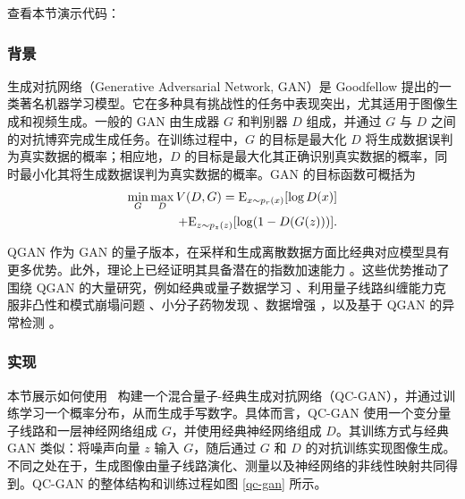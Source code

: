 查看本节演示代码：\href{https://gitee.com/mindspore/mindquantum/blob/research/paper_with_code/variational_quantum_circuits_enhanced_generative_adversarial_network/QGAN.py}{\color{ceruleanblue}{Gitee}} \ \href{https://github.com/donghufeng/mindquantum_tutorial_code/blob/master/whitepaper/code/chapt05/5.7_Q-GAN/QGAN.py}{\color{ceruleanblue}{GitHub}}

\subsubsection{背景}
生成对抗网络（Generative Adversarial Network, GAN）是 Goodfellow 提出的一类著名机器学习模型。它在多种具有挑战性的任务中表现突出，尤其适用于图像生成和视频生成。一般的 GAN 由生成器 ${G}$ 和判别器 ${D}$ 组成，并通过 ${G}$ 与 ${D}$ 之间的对抗博弈完成生成任务。在训练过程中，${G}$ 的目标是最大化 ${D}$ 将生成数据误判为真实数据的概率；相应地，${D}$ 的目标是最大化其正确识别真实数据的概率，同时最小化其将生成数据误判为真实数据的概率。GAN 的目标函数可概括为
\begin{equation}
  \begin{split}
    \mathop {\min }\limits_G \mathop {\max }\limits_D V(D,G) = {\rm{ }}{{\rm{E}}_{x\sim{p_r}(x)}}[\log D(x)]
    \\+ {{\rm{E}}_{z\sim{p_z}(z)}}[\log (1 - D(G(z)))]. \label{eq1}
  \end{split}
\end{equation}

QGAN 作为 GAN 的量子版本，在采样和生成离散数据方面比经典对应模型具有更多优势。此外，理论上已经证明其具备潜在的指数加速能力 \cite{lloyd2018quantum}。这些优势推动了围绕 QGAN 的大量研究，例如经典或量子数据学习 \cite{benedetti2019adversarial, zeng2019learning, zoufal2019quantum,ahmed2021quantum}、利用量子线路纠缠能力克服非凸性和模式崩塌问题 \cite{niu2022entangling}、小分子药物发现 \cite{li2021quantum}、数据增强 \cite{nakaji2021quantum}，以及基于 QGAN 的异常检测 \cite{herr2021anomaly}。

\subsubsection{实现}
本节展示如何使用 \MindQuantum\ 构建一个混合量子-经典生成对抗网络（QC-GAN）\cite{shu2024variational}，并通过训练学习一个概率分布，从而生成手写数字。具体而言，QC-GAN 使用一个变分量子线路和一层神经网络组成 ${G}$，并使用经典神经网络组成 ${D}$。其训练方式与经典 GAN 类似：将噪声向量 ${z}$ 输入 ${G}$，随后通过 ${G}$ 和 ${D}$ 的对抗训练实现图像生成。
不同之处在于，生成图像由量子线路演化、测量以及神经网络的非线性映射共同得到。QC-GAN 的整体结构和训练过程如图 \ref{qc-gan} 所示。

